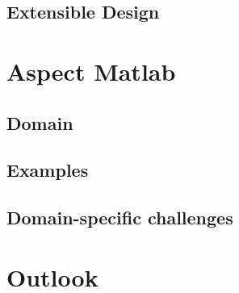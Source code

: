 \documentclass{beamer}
\begin{document}
\subsection{Extensible Design}  %

\section{Aspect Matlab} %

\subsection{Domain} %

\subsection{Examples} %

\subsection{Domain-specific challenges} %

\section{Outlook} %

\begin{frame}
  
\end{frame}
\end{document}
